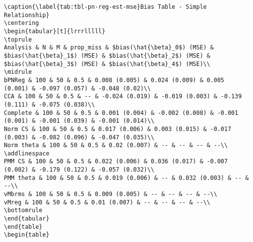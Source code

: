 \documentclass[
]{article}
\begin{document}
\begin{table}
\begin{minipage}[t]{\linewidth}
{\begin{verbatim}
\caption{\label{tab:tbl-pn-reg-est-mse}Bias Table - Simple Relationship}
\centering
\begin{tabular}[t]{lrrrlllll}
\toprule
Analysis & N & M & prop_miss & $bias(\hat{\beta}_0$) (MSE) & $bias(\hat{\beta}_1$) (MSE) & $bias(\hat{\beta}_2$) (MSE) & $bias(\hat{\beta}_3$) (MSE) & $bias(\hat{\beta}_4$) (MSE)\\
\midrule
bPNReg & 100 & 50 & 0.5 & 0.008 (0.005) & 0.024 (0.009) & 0.005 (0.001) & -0.097 (0.057) & -0.048 (0.02)\\
CCA & 100 & 50 & 0.5 & -- & -0.024 (0.019) & -0.019 (0.003) & -0.139 (0.111) & -0.075 (0.038)\\
Complete & 100 & 50 & 0.5 & 0.001 (0.004) & -0.002 (0.008) & -0.001 (0.001) & -0.001 (0.039) & -0.001 (0.014)\\
Norm CS & 100 & 50 & 0.5 & 0.017 (0.006) & 0.003 (0.015) & -0.017 (0.003) & -0.082 (0.096) & -0.047 (0.035)\\
Norm theta & 100 & 50 & 0.5 & 0.02 (0.007) & -- & -- & -- & --\\
\addlinespace
PMM CS & 100 & 50 & 0.5 & 0.022 (0.006) & 0.036 (0.017) & -0.007 (0.002) & -0.179 (0.122) & -0.057 (0.032)\\
PMM theta & 100 & 50 & 0.5 & 0.019 (0.006) & -- & 0.032 (0.003) & -- & --\\
vMbrms & 100 & 50 & 0.5 & 0.009 (0.005) & -- & -- & -- & --\\
vMreg & 100 & 50 & 0.5 & 0.01 (0.007) & -- & -- & -- & --\\
\bottomrule
\end{tabular}
\end{table}
\begin{table}


\end{verbatim}}
\end{minipage}
\end{table}
\end{document}
